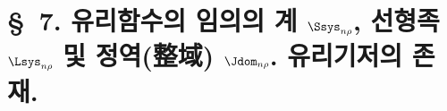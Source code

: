 
\section*{\S\ 7. 유리함수의 임의의 계 $\Ssys_{n\rho}$, 선형족 $\Lsys_{n\rho}$ 및 정역(整域) $\Jdom_{n\rho}$. 유리기저의 존재.}
